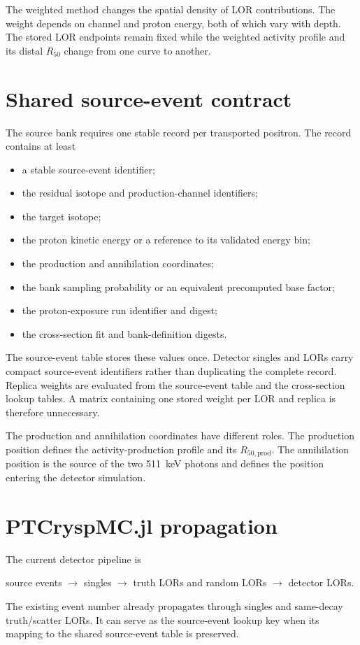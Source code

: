 \documentclass[11pt]{article}
\begin{document}
The weighted method changes the spatial density of LOR contributions.  The
weight depends on channel and proton energy, both of which vary with depth.
The stored LOR endpoints remain fixed while the weighted activity profile and
its distal $R_{50}$ change from one curve to another.

\section{Shared source-event contract}

The source bank requires one stable record per transported positron.  The
record contains at least
\begin{itemize}[nosep]
  \item a stable source-event identifier;
  \item the residual isotope and production-channel identifiers;
  \item the target isotope;
  \item the proton kinetic energy or a reference to its validated energy bin;
  \item the production and annihilation coordinates;
  \item the bank sampling probability or an equivalent precomputed base
        factor;
  \item the proton-exposure run identifier and digest;
  \item the cross-section fit and bank-definition digests.
\end{itemize}

The source-event table stores these values once.  Detector singles and LORs
carry compact source-event identifiers rather than duplicating the complete
record.  Replica weights are evaluated from the source-event table and the
cross-section lookup tables.  A matrix containing one stored weight per LOR
and replica is therefore unnecessary.

The production and annihilation coordinates have different roles.  The
production position defines the activity-production profile and its
$R_{50,\mathrm{prod}}$.  The annihilation position is the source of the two
\SI{511}{keV} photons and defines the position entering the detector
simulation.

\section{PTCryspMC.jl propagation}

The current detector pipeline is
\begin{center}
source events $\longrightarrow$ singles $\longrightarrow$ truth LORs and
random LORs $\longrightarrow$ detector LORs.
\end{center}
The existing event number already propagates through singles and same-decay
truth/scatter LORs.  It can serve as the source-event lookup key when its
mapping to the shared source-event table is preserved.
\end{document}
